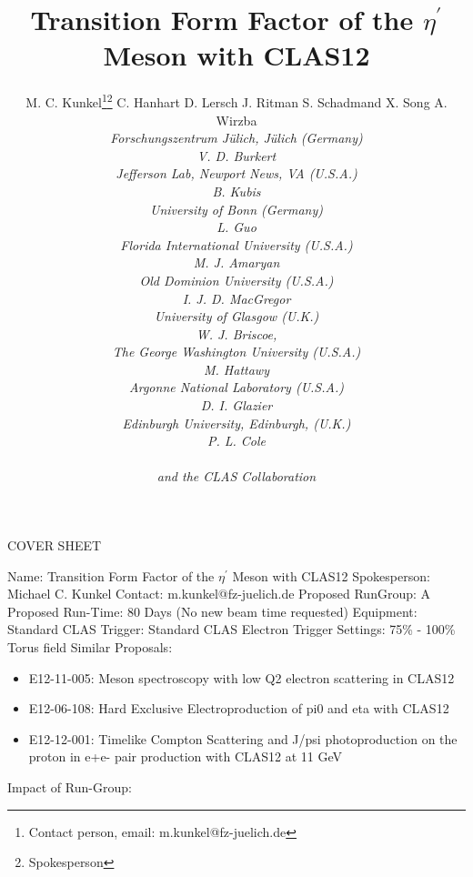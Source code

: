 \documentclass[11pt,a4paper]{article}
\title{Transition Form Factor of the $\eta^{\prime}$ Meson with CLAS12}
\date{}
\author{M. C. Kunkel\thanks{Contact person, email: m.kunkel@fz-juelich.de}\thanks{Spokesperson} \qquad C. Hanhart \qquad D. Lersch \qquad J. Ritman \qquad \hspace{2.2cm} S. Schadmand \qquad X. Song \qquad A. Wirzba \\ \vspace{-0.3cm} \it Forschungszentrum J\"ulich, J\"ulich (Germany) \\ \vspace{0.3cm} V. D. Burkert \\ \it Jefferson Lab, Newport News, VA (U.S.A.)  \\ \vspace{0.3cm} B. Kubis \\ \it University of Bonn (Germany) \\ \vspace{0.3cm} L. Guo \\ \it Florida International University (U.S.A.) \\ \vspace{0.3cm} M. J. Amaryan \\ \it Old Dominion University (U.S.A.) \\ \vspace{0.3cm} I. J. D. MacGregor  \\ \it University of Glasgow (U.K.) \\ \vspace{0.3cm} W. J. Briscoe,  \\ \it The George Washington University (U.S.A.) \\ \vspace{0.3cm} M. Hattawy \\ \it Argonne National Laboratory (U.S.A.) \\ \vspace{0.3cm} D. I. Glazier \\ \it Edinburgh University, Edinburgh, (U.K.) \\ \vspace{0.3cm} P. L. Cole
\\ \vspace{0.3cm} \ \\ \it and the CLAS Collaboration \newline \newline}
\begin{document}
\begin{titlepage}
		\begin{center}
			\LARGE{COVER SHEET} 		\newline \newline
		\end{center}

     \begin{flushleft}
			Name: Transition Form Factor of the $\eta^{\prime}$ Meson with CLAS12 \newline \newline
			Spokesperson: Michael C. Kunkel \newline \newline
			Contact: m.kunkel@fz-juelich.de \newline \newline
			Proposed RunGroup: A \newline \newline
			Proposed Run-Time: 80 Days (No new beam time requested)\newline \newline
			Equipment: Standard CLAS \newline \newline
			Trigger: Standard CLAS Electron Trigger \newline \newline
			Settings: 75\% - 100\% Torus field \newline \newline
			Similar Proposals: 
			\begin{itemize}
				\item E12-11-005: Meson spectroscopy with low Q2 electron scattering in CLAS12 
				\item E12-06-108: Hard Exclusive Electroproduction of pi0 and eta with CLAS12
				\item E12-12-001: Timelike Compton Scattering and J/psi photoproduction on the proton in e+e- pair production with CLAS12 at 11 GeV
			\end{itemize}
			Impact of Run-Group: 
		\end{flushleft}
	\end{titlepage}
\maketitle
\thispagestyle{firststyle}
\end{document}
